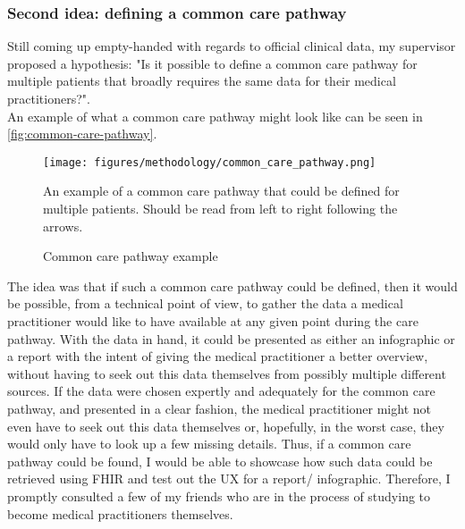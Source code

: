 \subsubsection*{Second idea: defining a common care pathway}
Still coming up empty-handed with regards to official clinical data, my supervisor proposed a hypothesis: "Is it possible to define a common care pathway for multiple patients that broadly requires the same data for their medical practitioners?".
\\
An example of what a common care pathway might look like can be seen in \autoref{fig:common-care-pathway}.

\begin{figure}[H]
    \centering
    \texttt{[image: figures/methodology/common\_care\_pathway.png]}
    \caption{Common care pathway example}
    \medskip
    \small
    \raggedright
    An example of a common care pathway that could be defined for multiple patients. Should be read from left to right following the arrows.
    \label{fig:common-care-pathway}
\end{figure}

\noindent
The idea was that if such a common care pathway could be defined, then it would be possible, from a technical point of view, to gather the data a medical practitioner would like to have available at any given point during the care pathway. With the data in hand, it could be presented as either an infographic or a report with the intent of giving the medical practitioner a better overview, without having to seek out this data themselves from possibly multiple different sources. If the data were chosen expertly and adequately for the common care pathway, and presented in a clear fashion, the medical practitioner might not even have to seek out this data themselves or, hopefully, in the worst case, they would only have to look up a few missing details. Thus, if a common care pathway could be found, I would be able to showcase how such data could be retrieved using FHIR and test out the UX for a report/ infographic. Therefore, I promptly consulted a few of my friends who are in the process of studying to become medical practitioners themselves. 

